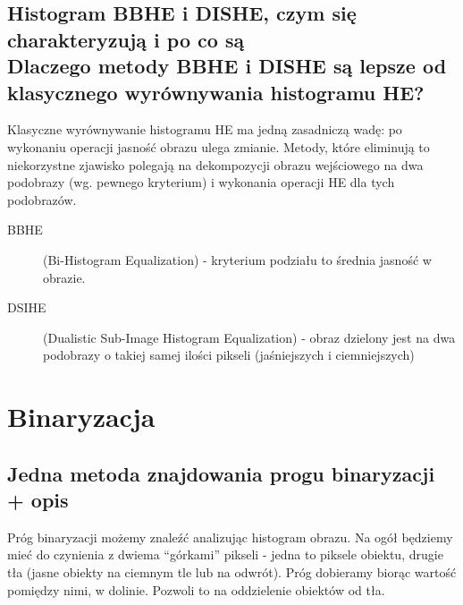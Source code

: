 \documentclass[a4paper, 12pt, titlepage]{article}
\begin{document}
\subsection{Histogram BBHE i DISHE, czym się charakteryzują i po co są \\ Dlaczego metody BBHE i DISHE są lepsze od klasycznego wyrównywania histogramu HE?}
Klasyczne wyrównywanie histogramu HE ma jedną zasadniczą wadę: po wykonaniu operacji
jasność obrazu ulega zmianie. Metody, które eliminują to niekorzystne zjawisko polegają na dekompozycji obrazu wejściowego na dwa podobrazy (wg. pewnego kryterium) i wykonania operacji HE dla tych podobrazów. 
\begin{description}
	\item[BBHE] (Bi-Histogram Equalization) - kryterium podziału to średnia jasność w obrazie.
	\item[DSIHE] (Dualistic Sub-Image Histogram Equalization) - obraz dzielony jest na dwa podobrazy o takiej samej ilości pikseli (jaśniejszych i ciemniejszych) 
\end{description}

\pagebreak\section{Binaryzacja}
\subsection{Jedna metoda znajdowania progu binaryzacji + opis}
Próg binaryzacji możemy znaleźć analizując histogram obrazu. Na ogół będziemy mieć do czynienia z dwiema “górkami” pikseli - jedna to piksele obiektu, drugie tła (jasne obiekty na ciemnym tle lub na odwrót). Próg dobieramy biorąc wartość pomiędzy nimi, w dolinie. Pozwoli to na oddzielenie obiektów od tła.
\end{document}
